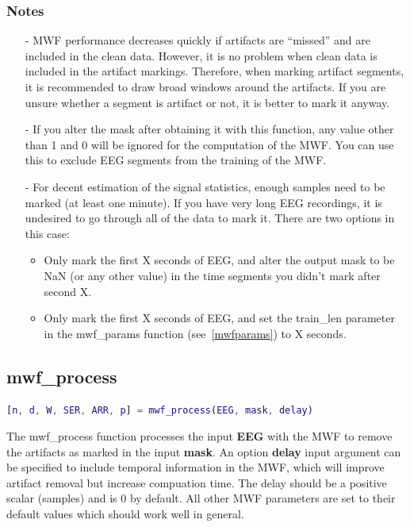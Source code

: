 \documentclass[11pt]{article}
\begin{document}
\subsubsection{Notes}

\begin{itemize}[noitemsep]
\item[-] MWF performance decreases quickly if artifacts are ``missed'' and are included in the clean data. However, it is no problem when clean data is included in the artifact markings. Therefore, when marking artifact segments, it is recommended to draw broad windows around the artifacts. If you are unsure whether a segment is artifact or not, it is better to mark it anyway.
\item[-] If you alter the mask after obtaining it with this function, any value other than 1 and 0 will be ignored for the computation of the MWF. You can use this to exclude EEG segments from the training of the MWF.
\item[-] For decent estimation of the signal statistics, enough samples need to be marked (at least one minute). If you have very long EEG recordings, it is undesired to go through all of the data to mark it. There are two options in this case:
\begin{itemize}[noitemsep]
\item Only mark the first X seconds of EEG, and alter the output mask to be NaN (or any other value) in the time segments you didn't mark after second X.
\item Only mark the first X seconds of EEG, and set the train\_len parameter in the mwf\_params function (see~\ref{mwfparams}) to X seconds. 
\end{itemize}
\end{itemize}

\vspace{10mm}

\subsection{mwf\_process}

\begin{lstlisting}[frame=single, language=matlab]
[n, d, W, SER, ARR, p] = mwf_process(EEG, mask, delay)
\end{lstlisting}

The mwf\_process function processes the input \textbf{EEG} with the MWF to remove the artifacts as marked in the input \textbf{mask}. An option \textbf{delay} input argument can be specified to include temporal information in the MWF, which will improve artifact removal but increase compuation time. The delay should be a positive scalar (samples) and is 0 by default. All other MWF parameters are set to their default values which should work well in general.
\end{document}
